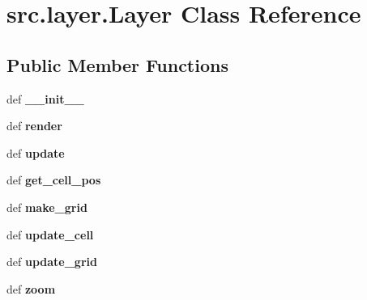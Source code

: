 \hypertarget{classsrc_1_1layer_1_1_layer}{\section{src.\-layer.\-Layer \-Class \-Reference}
\label{classsrc_1_1layer_1_1_layer}
}
\subsection*{\-Public \-Member \-Functions}
\begin{DoxyCompactItemize}
\item 
\hypertarget{classsrc_1_1layer_1_1_layer_a137dd7de61769f9f7f0f0cc57bdb2b00}{def {\bfseries \-\_\-\-\_\-init\-\_\-\-\_\-}}\label{classsrc_1_1layer_1_1_layer_a137dd7de61769f9f7f0f0cc57bdb2b00}

\item 
\hypertarget{classsrc_1_1layer_1_1_layer_a31ca33b8eba527ee2f50cb8c2c58a0f0}{def {\bfseries render}}\label{classsrc_1_1layer_1_1_layer_a31ca33b8eba527ee2f50cb8c2c58a0f0}

\item 
\hypertarget{classsrc_1_1layer_1_1_layer_a9ee40e5e48252fc2f86d41ecce639796}{def {\bfseries update}}\label{classsrc_1_1layer_1_1_layer_a9ee40e5e48252fc2f86d41ecce639796}

\item 
\hypertarget{classsrc_1_1layer_1_1_layer_ab7de06d6087fe89e3db18795777d2c03}{def {\bfseries get\-\_\-cell\-\_\-pos}}\label{classsrc_1_1layer_1_1_layer_ab7de06d6087fe89e3db18795777d2c03}

\item 
\hypertarget{classsrc_1_1layer_1_1_layer_aa173e4625a648a7c774aa9f6c8fb4e65}{def {\bfseries make\-\_\-grid}}\label{classsrc_1_1layer_1_1_layer_aa173e4625a648a7c774aa9f6c8fb4e65}

\item 
\hypertarget{classsrc_1_1layer_1_1_layer_a50fed0eb712fbb52eebff481a52a76f9}{def {\bfseries update\-\_\-cell}}\label{classsrc_1_1layer_1_1_layer_a50fed0eb712fbb52eebff481a52a76f9}

\item 
\hypertarget{classsrc_1_1layer_1_1_layer_a215ef49a929a36dd996de5338ca20a93}{def {\bfseries update\-\_\-grid}}\label{classsrc_1_1layer_1_1_layer_a215ef49a929a36dd996de5338ca20a93}

\item 
\hypertarget{classsrc_1_1layer_1_1_layer_a3a57617cb6fa2e07a82e88223283b100}{def {\bfseries zoom}}\label{classsrc_1_1layer_1_1_layer_a3a57617cb6fa2e07a82e88223283b100}

\end{DoxyCompactItemize}
